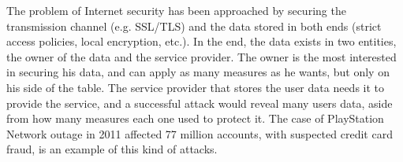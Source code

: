 The problem of Internet security has been approached by securing the transmission channel (e.g. SSL/TLS) and the data stored in both ends (strict access policies, local encryption, etc.). In the end, the data exists in two entities, the owner of the data and the service provider. The owner is the most interested in securing his data, and can apply as many measures as he wants, but only on his side of the table. The service provider that stores the user data needs it to provide the service, and a successful attack would reveal many users data, aside from how many measures each one used to protect it. The case of PlayStation Network outage in 2011 \citep{PSN2011} affected 77 million accounts, with suspected credit card fraud, is an example of this kind of attacks.

\hfil


